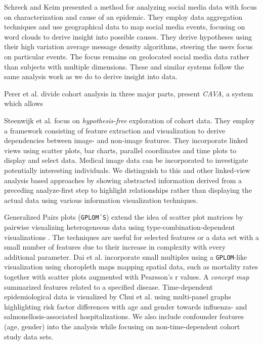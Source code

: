 \documentclass[journal]{style/vgtc} 			          %
\begin{document}
Schreck and Keim \cite{Schreck} presented a method for analyzing social media data with focus on characterization and cause of an epidemic.
They employ data aggregation techniques and use geographical data to map social media events, focusing on word clouds to derive insight into possible causes.
They derive hypotheses using their high variation average message density algorithms, steering the users focus on particular events.
The focus remains on geolocated social media data rather than subjects with multiple dimensions.
These and similar systems follow the same analysis work as we do to derive insight into data.

Perer et al. divide cohort analysis in three major parts, present \emph{CAVA}, a system which allows 

Steenwijk et al. \cite{Steenwijk} focus on \emph{hypothesis-free} exploration of cohort data.
They employ a framework consisting of feature extraction and visualization to derive dependencies between image- and non-image features.
They incorporate linked views using scatter plots, bar charts, parallel coordinates and time plots to display and select data.
Medical image data can be incorporated to investigate potentially interesting individuals.
We distinguish to this and other linked-view analysis based approaches by showing abstracted information derived from a preceding analyze-first step to highlight relationships rather than displaying the actual data using various information visualization techniques.

Generalized Pairs plots (\texttt{GPLOM´S}) extend the idea of scatter plot matrices by pairwise visualizing heterogeneous data using type-combination-dependent visualizations \cite{GPLOMS, Francois2013}.
The techniques are useful for selected features or a data set with a small number of features due to their increase in complexity with every additional parameter.
Dai et al. \cite{Dai2005} incorporate small multiples using a \texttt{GPLOM}-like visualization using choropleth maps mapping spatial data, such as mortality rates together with scatter plots augmented with Pearsson's r values.
A \emph{concept map} summarized features related to a specified disease.
Time-dependent epidemiological data is visualized by Chui et al. \cite{Chui2011} using multi-panel graphs highlighting risk factor differences with age and gender towards influenza- and salmonellosis-associated hospitalizations.
We also include confounder features (age, gender) into the analysis while focusing on non-time-dependent cohort study data sets.
\end{document}
